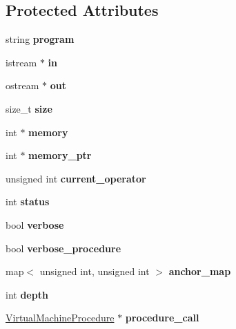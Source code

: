 \subsection*{Protected Attributes}
\begin{DoxyCompactItemize}
\item 
\mbox{\label{classVirtualMachine_a4d60f4b532942602eee8492ab0d21afc}} 
string {\bfseries program}
\item 
\mbox{\label{classVirtualMachine_a91504e81123c4799eb86397567adf124}} 
istream $\ast$ {\bfseries in}
\item 
\mbox{\label{classVirtualMachine_a2536e46cc553233a55b5ce37174b805e}} 
ostream $\ast$ {\bfseries out}
\item 
\mbox{\label{classVirtualMachine_ac34063086f2ac1fcf0948b047e21d7d3}} 
size\+\_\+t {\bfseries size}
\item 
\mbox{\label{classVirtualMachine_a181524e58d377d458ce08789392edd05}} 
int $\ast$ {\bfseries memory}
\item 
\mbox{\label{classVirtualMachine_a70e4bcf4a8dc15f1bd2623f174911949}} 
int $\ast$ {\bfseries memory\+\_\+ptr}
\item 
\mbox{\label{classVirtualMachine_aa1fe839b3c60ed06f08d25234a942fec}} 
unsigned int {\bfseries current\+\_\+operator}
\item 
\mbox{\label{classVirtualMachine_aaca3982311ac4bb0fcdc245c917cb0c9}} 
int {\bfseries status}
\item 
\mbox{\label{classVirtualMachine_a6f03a3c1e97c82b919d40216dada8a62}} 
bool {\bfseries verbose}
\item 
\mbox{\label{classVirtualMachine_a32813e2f6f744d057ff3fb3247263ce6}} 
bool {\bfseries verbose\+\_\+procedure}
\item 
\mbox{\label{classVirtualMachine_a79c1eaa2d795cb60a3046f5602e73b55}} 
map$<$ unsigned int, unsigned int $>$ {\bfseries anchor\+\_\+map}
\item 
\mbox{\label{classVirtualMachine_a4dcdbb9cd441a4f356212cf1dcabab9c}} 
int {\bfseries depth}
\item 
\mbox{\label{classVirtualMachine_a7ed46115fe6a39029de0674aa4fa69fd}} 
\hyperlink{classVirtualMachineProcedure}{Virtual\+Machine\+Procedure} $\ast$ {\bfseries procedure\+\_\+call}
\end{DoxyCompactItemize}


